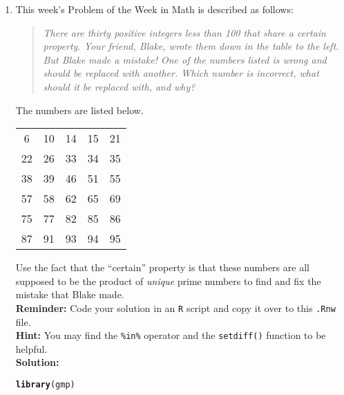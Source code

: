 \documentclass{article}\usepackage[]{graphicx}\usepackage[]{xcolor}
\makeatletter
\newcommand{\hldef}[1]{\textcolor[rgb]{0.345,0.345,0.345}{#1}}%
\newcommand{\hlkwd}[1]{\textcolor[rgb]{0.737,0.353,0.396}{\textbf{#1}}}%
\newenvironment{kframe}{%
 \def\at@end@of@kframe{}%
 \ifinner\ifhmode%
  \def\at@end@of@kframe{\end{minipage}}%
  \begin{minipage}{\columnwidth}%
 \fi\fi%
 \def\FrameCommand##1{\hskip\@totalleftmargin \hskip-\fboxsep
 \colorbox{shadecolor}{##1}\hskip-\fboxsep
     \hskip-\linewidth \hskip-\@totalleftmargin \hskip\columnwidth}%
 \MakeFramed {\advance\hsize-\width
   \@totalleftmargin\z@ \linewidth\hsize
   \@setminipage}}%
 {\par\unskip\endMakeFramed%
 \at@end@of@kframe}
\newenvironment{knitrout}{}{} %
\makeatother
\begin{document}
\begin{enumerate}
\item This week's Problem of the Week in Math is described as follows:
\begin{quotation}
  \textit{There are thirty positive integers less than 100 that share a certain 
  property. Your friend, Blake, wrote them down in the table to the left. But 
  Blake made a mistake! One of the numbers listed is wrong and should be replaced 
  with another. Which number is incorrect, what should it be replaced with, and 
  why?}
\end{quotation}
The numbers are listed below.
\begin{center}
  \begin{tabular}{ccccc}
    6 & 10 & 14 & 15 & 21\\
    22 & 26 & 33 & 34 & 35\\
    38 & 39 & 46 & 51 & 55\\
    57 & 58 & 62 & 65 & 69\\
    75 & 77 & 82 & 85 & 86\\
    87 & 91 & 93 & 94 & 95
  \end{tabular}
\end{center}
Use the fact that the ``certain'' property is that these numbers are all supposed
to be the product of \emph{unique} prime numbers to find and fix the mistake that
Blake made.\\
\textbf{Reminder:} Code your solution in an \texttt{R} script and copy it over
to this \texttt{.Rnw} file.\\
\textbf{Hint:} You may find the \verb|%in%| operator and the \verb|setdiff()| function to be helpful.\\

\textbf{Solution:} 

\begin{knitrout}\scriptsize
{}\color{fgcolor}\begin{kframe}
\begin{alltt}
\hlkwd{library}\hldef{(gmp)}


\end{alltt}
\end{kframe}
\end{knitrout}
\end{enumerate}
\end{document}
